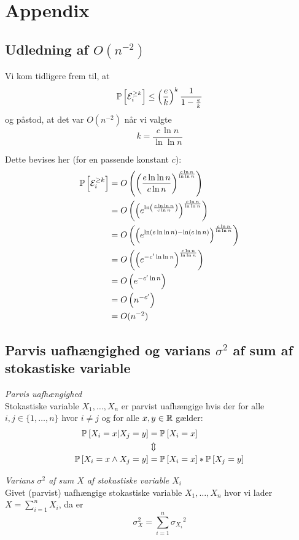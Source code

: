 \section{Appendix} \label{sec:appendix}
\subsection{Udledning af $O(n^{-2})$} \label{subsec:udledningO}
Vi kom tidligere frem til, at
$$
\P{ \event_i^{\geq k} } \leq \pfrac{e}{k}^k \frac{1}{1 - \frac{e}{k}}
$$
og påstod, at det var $O(n^{-2})$ når vi valgte
$$
k = \frac{c \, \ln n}{\ln \ln n}
$$

Dette bevises her (for en passende konstant $c$):
\begin{align*}
  \P{ \event_i^{\geq k} }
  &= O \p{ \pfrac{e \ln \ln n}{c \ln n}^{\frac{c \ln n}{\ln \ln n}} }\\
  &= O \p{ \p{ e^{\ln \pfrac{e \ln \ln n}{c \ln n}} }^{\frac{c \ln n}{\ln \ln n}} }\\
  &= O \p{ \p{ e^{\ln(e \ln \ln n) - \ln (c \ln n)} }^{\frac{c \ln n}{\ln \ln n}} }\\
  &= O \p{ \p{ e^{-c' \ln \ln n} }^{\frac{c \ln n}{\ln \ln n}} }\\
  &= O \p{ e^{- c' \ln n} }\\
  &= O \p{ n^{-c'} }\\
  &= O(n^{-2})
\end{align*}



\subsection{Parvis uafhængighed og varians $\sigma^2$ af sum af stokastiske variable} \label{subsec:parvis}
\textit{Parvis uafhængighed}\\
Stokastiske variable $X_1, \dots, X_n$ er parvist uafhængige hvis der for alle $i, j \in \{1, \dots, n \}$ hvor $i \neq j$ og for alle $x, y \in \R$ gælder:
\begin{align*}
  \P{X_i = x | X_j = y} &= \P{X_i = x}\\
  &\Updownarrow\\
  \P{X_i = x \land X_j = y} &= \P{X_i = x} * \P{X_j = y}
\end{align*}

\textit{Varians $\sigma^2$ af sum $X$ af stokastiske variable $X_i$}\\
Givet (parvist) uafhængige stokastiske variable $X_1, \dots, X_n$ hvor vi lader $X = \sum_{i=1}^n X_i$, da er
$$
\sigma_X^2 = \sum_{i=1}^n {\sigma_{X_i}}^2
$$

